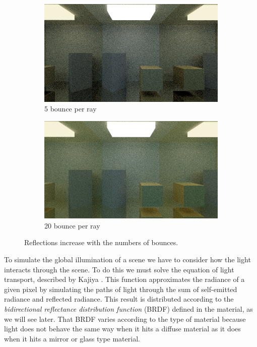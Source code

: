 \documentclass[titlepage,12pt]{report}
\begin{document}
\begin{figure}[H]
	\medskip	
	\begin{subfigure}{.48\textwidth}
		\centering
		\includegraphics[scale=0.315]{media/mirrors_rect/cornell_mirrors_5.png}
		\caption{5 bounce per ray}
		\label{mr_rect_5}
	\end{subfigure}
	\begin{subfigure}{.48\textwidth}
		\centering
		\includegraphics[scale=0.315]{media/mirrors_rect/cornell_mirrors_20.png}	
		\caption{20 bounce per ray}
		\label{mr_rect_20}
	\end{subfigure}
	\caption{Reflections increase with the numbers of bounces.}
	\label{bounces}
\end{figure}

To simulate the global illumination of a scene we have to consider how the light interacts through the scene. To do this we must solve the equation of light transport, described by Kajiya \citep[pp.~143--150]{Kajiya1986}. This function approximates the radiance of a given pixel by simulating the paths of light through the sum of self-emitted radiance and reflected radiance. This result is distributed according to the \textit{bidirectional reflectance distribution function} (BRDF) defined in the material, as we will see later. That BRDF varies according to the type of material because light does not behave the same way when it hits a diffuse material as it does when it hits a mirror or glass type material.
\end{document}
